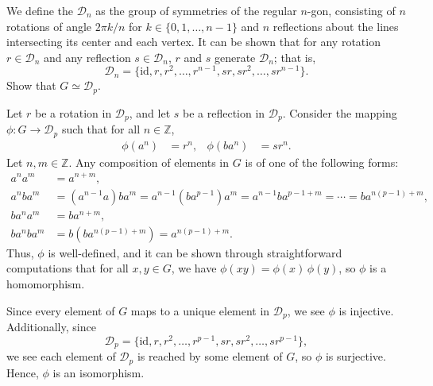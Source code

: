 \begin{exer}
We define the  $ \mathcal{D}_n $ as the group of symmetries of the regular $ n $-gon, consisting of $ n $ rotations of angle $ 2\pi k/n $ for $ k\in\{0,1,\ldots,n-1\} $ and $ n $ reflections about the lines intersecting its center and each vertex. It can be shown that for any rotation $ r\in\mathcal{D}_n $ and any reflection $ s\in\mathcal{D}_n $, $ r $ and $ s $ generate $ \mathcal{D}_n $; that is,
\begin{equation*}
    \mathcal{D}_n=\{\mathrm{id},r,r^2,\ldots,r^{n-1},sr,sr^2,\ldots,sr^{n-1}\}.
\end{equation*}
Show that $ G\simeq\mathcal{D}_p $.
\end{exer}
\begin{sltn}
Let $ r $ be a rotation in $ \mathcal{D}_p $, and let $ s $ be a reflection in $ \mathcal{D}_p $. Consider the mapping $ \phi:G\to\mathcal{D}_p $ such that for all $ n\in\mathbb{Z} $,
\begin{align*}
    \phi(a^n) &= r^n, & \phi(ba^n) &= sr^n.
\end{align*}
Let $ n,m\in\mathbb{Z} $. Any composition of elements in $ G $ is of one of the following forms:
\begin{align*}
    a^na^m &= a^{n+m}, \\
    a^nba^m &= (a^{n-1}a)ba^m=a^{n-1}(ba^{p-1})a^m=a^{n-1}ba^{p-1+m}=\cdots=ba^{n(p-1)+m}, \\
    ba^na^m &= ba^{n+m}, \\
    ba^nba^m &= b(ba^{n(p-1)+m})=a^{n(p-1)+m}.
\end{align*}
Thus, $ \phi $ is well-defined, and it can be shown through straightforward computations that for all $ x,y\in G $, we have $ \phi(xy)=\phi(x)\,\phi(y) $, so $ \phi $ is a homomorphism.
    
Since every element of $ G $ maps to a unique element in $ \mathcal{D}_p $, we see $ \phi $ is injective. Additionally, since
\begin{equation*}
    \mathcal{D}_p=\{\mathrm{id},r,r^2,\ldots,r^{p-1},sr,sr^2,\ldots,sr^{p-1}\},
\end{equation*}
we see each element of $ \mathcal{D}_p $ is reached by some element of $ G $, so $ \phi $ is surjective. Hence, $ \phi $ is an isomorphism.
\end{sltn}